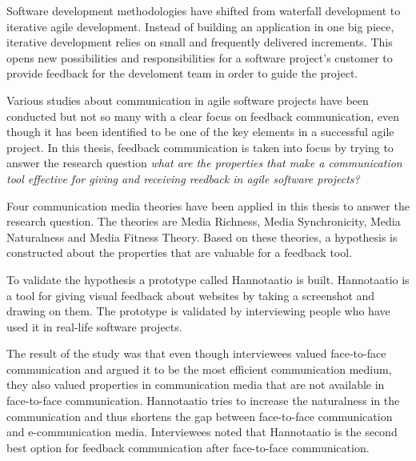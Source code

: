 \documentclass[english,12pt,a4paper,pdftex]{article}
\begin{document}
\newpage
%
\begin{abstractpage}[english]

Software development methodologies have shifted from waterfall development to iterative agile development. Instead of building an application in one big piece, iterative development relies on small and frequently delivered increments. This opens new possibilities and responsibilities for a software project's customer to provide feedback for the develoment team in order to guide the project.

Various studies about communication in agile software projects have been conducted but not so many with a clear focus on feedback communication, even though it has been identified to be one of the key elements in a successful agile project. In this thesis, feedback communication is taken into focus by trying to answer the research question \emph{what are the properties that make a communication tool effective for giving and receiving reedback in agile software projects?}

Four communication media theories have been applied in this thesis to answer the research question. The theories are Media Richness, Media Synchronicity, Media Naturalness and Media Fitness Theory. Based on these theories, a hypothesis is constructed about the properties that are valuable for a feedback tool.

To validate the hypothesis a prototype called Hannotaatio is built. Hannotaatio is a tool for giving visual feedback about websites by taking a screenshot and drawing on them. The prototype is validated by interviewing people who have used it in real-life software projects.

The result of the study was that even though interviewees valued face-to-face communication and argued it to be the most efficient communication medium, they also valued properties in communication media that are not available in face-to-face communication. Hannotaatio tries to increase the naturalness in the communication and thus shortens the gap between face-to-face communication and e-communication media. Interviewees noted that Hannotaatio is the second best option for feedback communication after face-to-face communication.

\end{abstractpage}
\end{document}
